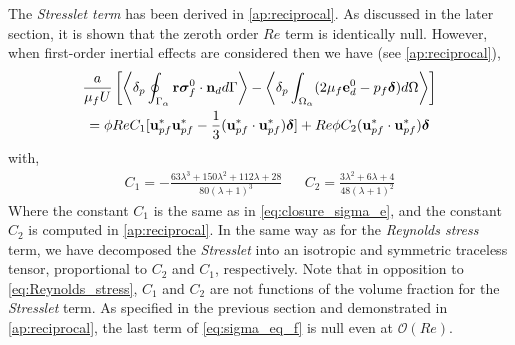 The \textit{Stresslet term} has been derived in \ref{ap:reciprocal}. 
As discussed in the later section, it is shown that the zeroth order $Re$ term is identically null. 
However, when first-order inertial effects are considered then we have (see \ref{ap:reciprocal}),
\begin{multline}
    \frac{a}{\mu_f U}\left[
        \pSavg{\textbf{r}\bm{\sigma}_f^0 \cdot \textbf{n}_d}
        - \pOavg{(2 \mu_f \textbf{e}_d^0 - p_f\bm\delta)}
        \right]\\
    =
     \phi Re C_1
    [
        \textbf{u}_{pf}^*\textbf{u}_{pf}^* - \frac{1}{3}(\textbf{u}_{pf}^*\cdot \textbf{u}_{pf}^*)\bm\delta 
    ]
    + Re \phi C_2 (\textbf{u}_{pf}^*\cdot \textbf{u}_{pf}^*) \bm\delta
    \label{eq:stresslet_trans}
\end{multline} 
with, 
\begin{align}
    C_1  =  -\frac{63 \lambda^{3} + 150 \lambda^{2} + 112 \lambda + 28}{80 \left(\lambda + 1\right)^{3}}
    &&
    C_2  = \frac{3\lambda^2 + 6\lambda + 4}{48(\lambda +1 )^2}
\end{align}
Where the constant $C_1$ is the same as in \ref{eq:closure_sigma_e}, and the constant $C_2$ is computed in  \ref{ap:reciprocal}. 
In the same way as for the \textit{Reynolds stress} term, we have decomposed the \textit{Stresslet} into an isotropic and symmetric traceless tensor, proportional to $C_2$ and $C_1$, respectively. 
Note that in opposition to \ref{eq:Reynolds_stress}, $C_1$ and $C_2$ are not functions of the volume fraction for the \textit{Stresslet} term. 
As specified in the previous section and demonstrated in \ref{ap:reciprocal}, the last term of \ref{eq:sigma_eq_f} is null even at $\mathcal{O}(Re)$. 


